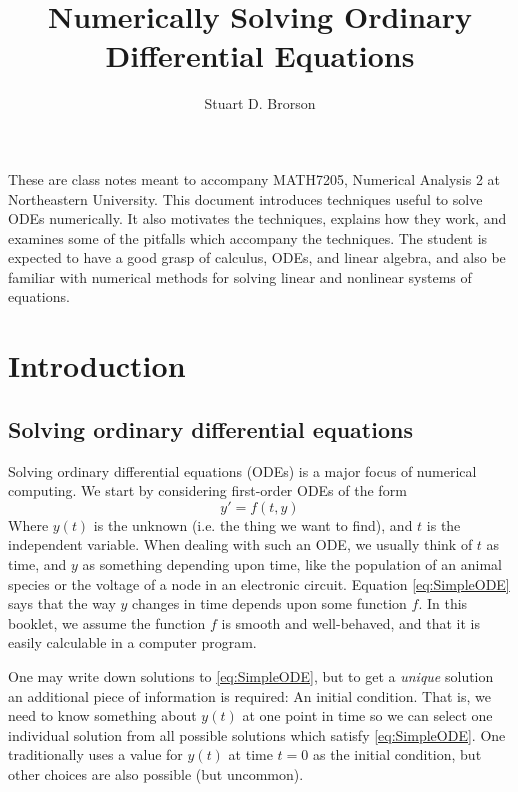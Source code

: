 \documentclass[hidelinks,notitlepage]{book}
\title{Numerically Solving Ordinary Differential Equations}
\author{Stuart D. Brorson}
\affil{Northeastern University}
\begin{document}
\maketitle


These are class notes meant to accompany MATH7205, Numerical Analysis 2 at Northeastern University.   This document introduces techniques useful to solve ODEs numerically.  It also motivates the techniques, explains how they work, and examines some of the pitfalls which accompany the techniques.  The student is expected to have a good grasp of calculus, ODEs, and linear algebra, and also be familiar with numerical methods for solving linear and nonlinear systems of equations.

\vspace*{\fill}
\doclicenseThis

\newpage

\tableofcontents

\mainmatter
\chapter{Introduction}
\section{Solving ordinary differential equations}
Solving ordinary differential equations (ODEs) is a major focus of numerical computing.  We start by considering first-order ODEs of the form
\begin{equation}
\label{eq:SimpleODE}
y' = f(t, y) 
\end{equation}
Where $y(t)$ is the unknown (i.e. the thing we want to find), and $t$ is the independent variable.  When dealing with such an ODE, we usually think of $t$ as
time, and $y$ as something depending upon time, like the population of an animal species or the voltage of a node in an electronic circuit.  
Equation \cref{eq:SimpleODE} says that the way $y$ changes in time depends upon some function $f$.  
In this booklet, we assume the function $f$ is smooth and well-behaved, and that it is easily calculable in a computer program.

One may write down solutions to \cref{eq:SimpleODE}, but to get a \textit{unique} solution an additional piece of information is required:  An initial condition.  That is, we need to know something about $y(t)$ at one point in time so we can select one individual solution from all possible solutions which satisfy \ref{eq:SimpleODE}.  One traditionally uses a value for $y(t)$ at time $t=0$ as the initial condition, but other choices are also possible (but uncommon). 
\end{document}
